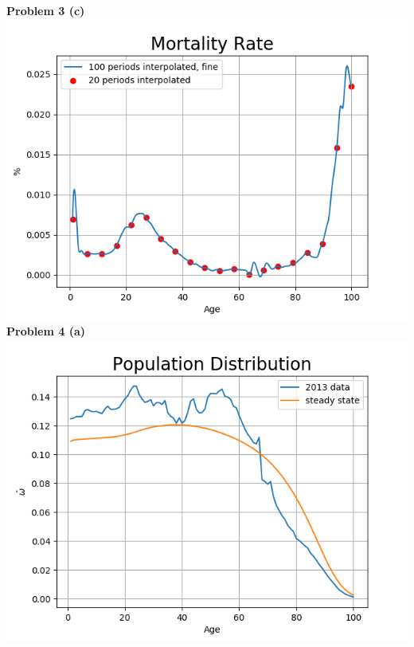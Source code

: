\documentclass[letterpaper,12pt]{article}
\theoremstyle{definition}
\begin{document}
\noindent\textbf{Problem 3 (c)}\\
\includegraphics[scale=0.5]{images_dem/imm_rate_20.png}
\\
\noindent\textbf{Problem 4 (a)}\\
\includegraphics[scale=0.5]{images_dem/population_dist.png}
\\
\end{document}
